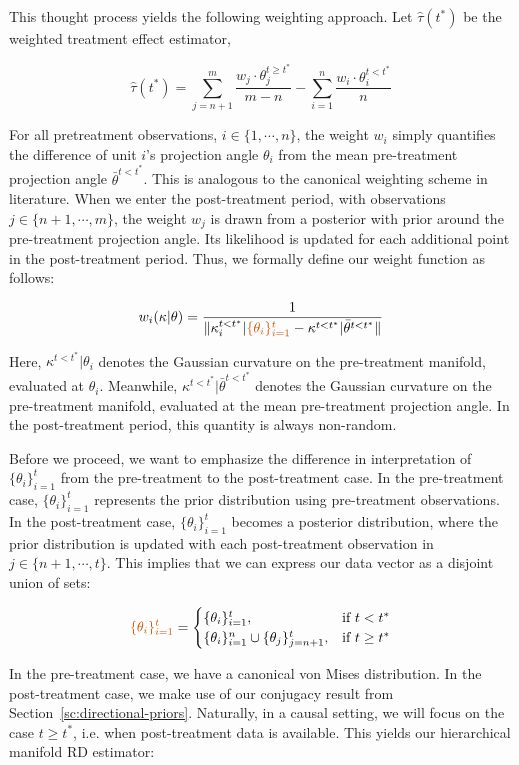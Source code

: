 \documentclass[twoside,11pt]{article}
\begin{document}
This thought process yields the following weighting approach. Let $\hat{\tau}(t^*)$ be the weighted treatment effect estimator, 

\[
  \hat{\tau}(t^*) = \sum_{j=n+1}^{m} \frac{w_j \cdot \theta_j^{t \geq t^*}}{m - n} - \sum_{i=1}^{n} \frac{w_i \cdot \theta_i^{t < t^*}}{n}
\]

For all pretreatment observations, $i \in \{1, \cdots, n\}$, the weight $w_i$ simply quantifies the difference of unit $i$'s projection angle $\theta_i$ from the mean pre-treatment projection angle $\bar{\theta}^{t < t^*}$. This is analogous to the canonical weighting scheme in literature. When we enter the post-treatment period, with observations $j \in \{n+1, \cdots, m\}$, the weight $w_j$ is drawn from a posterior with prior around the pre-treatment projection angle. Its likelihood is updated for each additional point in the post-treatment period. Thus, we formally define our weight function as follows: 

$$
w_i(\kappa|\theta) = 
  \frac{1}{\|\kappa_i^{t<t^*}|\textcolor{darkorange}{\{\theta_i\}_{i=1}^{t}} - \kappa^{t<t^*}|\bar{\theta}^{t<t^*}\|}
$$

Here, $\kappa^{t<t^*}|\theta_i$ denotes the Gaussian curvature on the pre-treatment manifold, evaluated at $\theta_i$. Meanwhile, $\kappa^{t<t^*}|\bar{\theta}^{t<t^*}$ denotes the Gaussian curvature on the pre-treatment manifold, evaluated at the mean pre-treatment projection angle. In the post-treatment period, this quantity is always non-random. 

Before we proceed, we want to emphasize the difference in interpretation of ${\{\theta_i\}_{i=1}^t}$ from the pre-treatment to the post-treatment case. In the pre-treatment case, ${\{\theta_i\}_{i=1}^t}$ represents the prior distribution using pre-treatment observations. In the post-treatment case, ${\{\theta_i\}_{i=1}^t}$ becomes a posterior distribution, where the prior distribution is updated with each post-treatment observation in $j \in \{n+1, \cdots, t\}$. This implies that we can express our data vector as a disjoint union of sets:

$$
\textcolor{darkorange}{\{\theta_i\}_{i=1}^t} = 
\begin{cases}
\{\theta_i\}_{i=1}^{t}, & \text{if } t < t^* \\ 
\{\theta_i\}_{i=1}^{n} \cup \{\theta_j\}_{j=n+1}^{t}, & \text{if } t \geq t^*
\end{cases}
$$

In the pre-treatment case, we have a canonical von Mises distribution. In the post-treatment case, we make use of our conjugacy result from Section~\ref{sc:directional-priors}. Naturally, in a causal setting, we will focus on the case $t \geq t^*$, i.e. when post-treatment data is available. This yields our hierarchical manifold RD estimator: 
\end{document}
